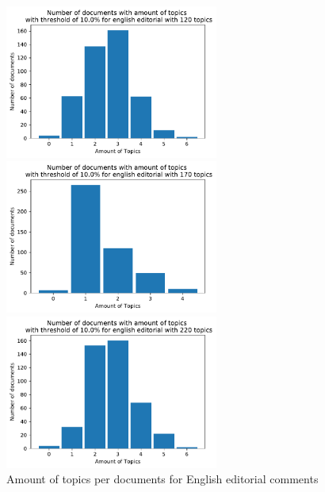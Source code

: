 \begin{figure}[t]
	\centering
	\includegraphics[width=7cm]{gfx/GrafikenFinal/englisheditorialnmf_topPerdoc120.pdf}\par\medskip
	\begin{minipage}{0.5\textwidth}
		\centering
		\includegraphics[width=7cm]{gfx/GrafikenFinal/englisheditorialnmf_topPerdoc170.pdf}
	\end{minipage}%
	\begin{minipage}{0.5\textwidth}
		\centering
		\includegraphics[width=7cm]{gfx/GrafikenFinal/englisheditorialnmf_topPerdoc220.pdf}
	\end{minipage}
	\caption[]{Amount of topics per documents for English editorial comments}
\end{figure}

